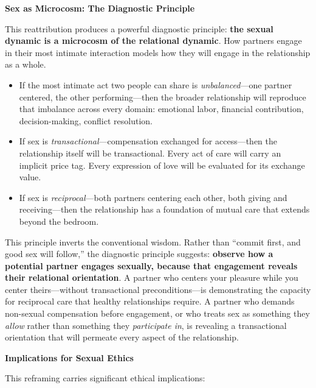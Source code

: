 \documentclass[12pt, letterpaper]{article}
\begin{document}
\textbf{Sex as Microcosm: The Diagnostic Principle}

This reattribution produces a powerful diagnostic principle: \textbf{the sexual dynamic is a microcosm of the relational dynamic}. How partners engage in their most intimate interaction models how they will engage in the relationship as a whole.

\begin{itemize}
    \item If the most intimate act two people can share is \textit{unbalanced}---one partner centered, the other performing---then the broader relationship will reproduce that imbalance across every domain: emotional labor, financial contribution, decision-making, conflict resolution.
    
    \item If sex is \textit{transactional}---compensation exchanged for access---then the relationship itself will be transactional. Every act of care will carry an implicit price tag. Every expression of love will be evaluated for its exchange value.
    
    \item If sex is \textit{reciprocal}---both partners centering each other, both giving and receiving---then the relationship has a foundation of mutual care that extends beyond the bedroom.
\end{itemize}

This principle inverts the conventional wisdom. Rather than ``commit first, and good sex will follow,'' the diagnostic principle suggests: \textbf{observe how a potential partner engages sexually, because that engagement reveals their relational orientation}. A partner who centers your pleasure while you center theirs---without transactional preconditions---is demonstrating the capacity for reciprocal care that healthy relationships require. A partner who demands non-sexual compensation before engagement, or who treats sex as something they \textit{allow} rather than something they \textit{participate in}, is revealing a transactional orientation that will permeate every aspect of the relationship.

\textbf{Implications for Sexual Ethics}

This reframing carries significant ethical implications:
\end{document}
